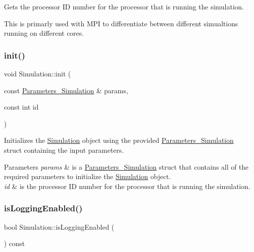 Gets the processor ID number for the processor that is running the simulation. 

This is primarly used with M\+PI to differentiate between different simualtions running on different cores. \mbox{\label{class_simulation_af88e5e0634b373ba28f1dd87670725a6}} 
\subsubsection{\texorpdfstring{init()}{init()}}
{\footnotesize\ttfamily void Simulation\+::init (\begin{DoxyParamCaption}\item[{const \hyperlink{struct_parameters___simulation}{Parameters\+\_\+\+Simulation} \&}]{params,  }\item[{const int}]{id }\end{DoxyParamCaption})}



Initializes the \hyperlink{class_simulation}{Simulation} object using the provided \hyperlink{struct_parameters___simulation}{Parameters\+\_\+\+Simulation} struct containing the input parameters. 


\begin{DoxyParams}{Parameters}
{\em params} & is a \hyperlink{struct_parameters___simulation}{Parameters\+\_\+\+Simulation} struct that contains all of the required parameters to initialize the \hyperlink{class_simulation}{Simulation} object. \\
\hline
{\em id} & is the processor ID number for the processor that is running the simulation. \\
\hline
\end{DoxyParams}
\mbox{\label{class_simulation_ac7c8a49a4cc506b850891480e0aae512}} 
\subsubsection{\texorpdfstring{is\+Logging\+Enabled()}{isLoggingEnabled()}}
{\footnotesize\ttfamily bool Simulation\+::is\+Logging\+Enabled (\begin{DoxyParamCaption}{ }\end{DoxyParamCaption}) const}



